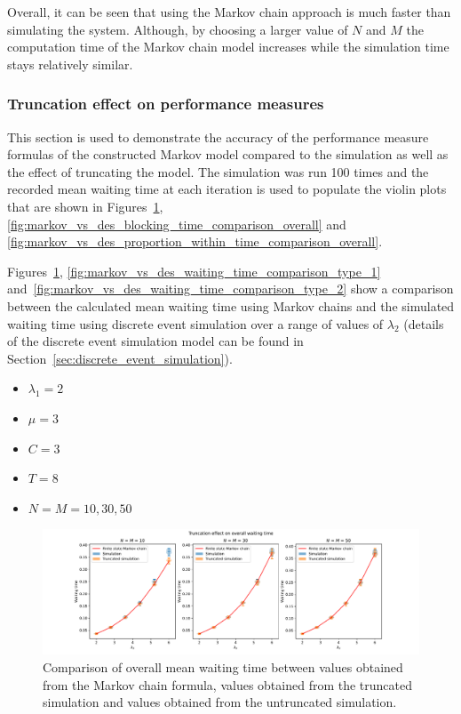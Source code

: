 Overall, it can be seen that using the Markov chain approach is much faster than
simulating the system.
Although, by choosing a larger value of \(N\) and \(M\) the computation time of
the Markov chain model increases while the simulation time stays relatively 
similar.

\subsubsection{Truncation effect on performance measures}

This section is used to demonstrate the accuracy of the performance measure
formulas of the constructed Markov model compared to the simulation as well as
the effect of truncating the model.
The simulation was run 100 times and the recorded mean waiting time at each
iteration is used to populate the violin plots that are shown in
Figures~\ref{fig:markov_vs_des_waiting_time_comparison_overall},
\ref{fig:markov_vs_des_blocking_time_comparison_overall} and
\ref{fig:markov_vs_des_proportion_within_time_comparison_overall}.

Figures~\ref{fig:markov_vs_des_waiting_time_comparison_overall}, 
\ref{fig:markov_vs_des_waiting_time_comparison_type_1}
and~\ref{fig:markov_vs_des_waiting_time_comparison_type_2} show a 
comparison between the calculated mean waiting time using Markov chains and the
simulated waiting time using discrete event simulation over a range of values of 
\(\lambda_2\) (details of the discrete event simulation model can be found in 
Section~\ref{sec:discrete_event_simulation}).

\begin{itemize}
    \item \(\lambda_1 = 2\)
    \item \(\mu = 3\)
    \item \(C = 3\)
    \item \(T = 8\)
    \item \(N = M = 10, 30, 50\)
\end{itemize}

\begin{figure}[H]
    \includegraphics[width=\textwidth]{chapters/03_queueing_model/img/numeric_results_and_timings/truncation_effect/waiting_time_overall.pdf}
    \caption{
        Comparison of overall mean waiting time between values obtained from the
        Markov chain formula, values obtained from the truncated simulation and
        values obtained from the untruncated simulation.
    }
    \label{fig:markov_vs_des_waiting_time_comparison_overall}
\end{figure}

